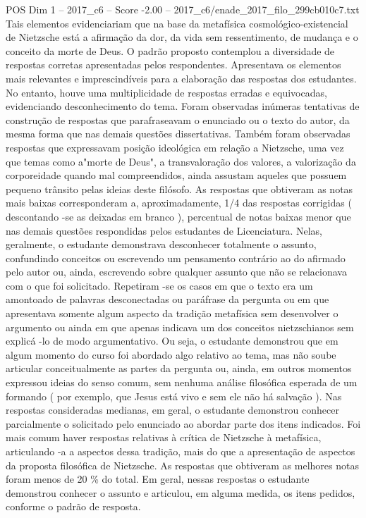 \begin{textsample}{POS Dim 1 – 2017\_c6 – Score -2.00 – 2017\_c6/enade\_2017\_filo\_299cb010c7.txt}
Tais elementos evidenciariam que na base da metafísica cosmológico-existencial de Nietzsche está a afirmação da dor, da vida sem ressentimento, de mudança e o conceito da morte de Deus.
O padrão proposto contemplou a diversidade de respostas corretas apresentadas pelos respondentes.
Apresentava os elementos mais relevantes e imprescindíveis para a elaboração das respostas dos estudantes.
No entanto, houve uma multiplicidade de respostas erradas e equivocadas, evidenciando desconhecimento do tema.
Foram observadas inúmeras tentativas de construção de respostas que parafraseavam o enunciado ou o texto do autor, da mesma forma que nas demais questões dissertativas.
Também foram observadas respostas que expressavam posição ideológica em relação a Nietzsche, uma vez que temas como a"morte de Deus", a transvaloração dos valores, a valorização da corporeidade quando mal compreendidos, ainda assustam aqueles que possuem pequeno trânsito pelas ideias deste filósofo.
As respostas que obtiveram as notas mais baixas corresponderam a, aproximadamente, 1/4 das respostas corrigidas ( descontando -se as deixadas em branco ), percentual de notas baixas menor que nas demais questões respondidas pelos estudantes de Licenciatura.
Nelas, geralmente, o estudante demonstrava desconhecer totalmente o assunto, confundindo conceitos ou escrevendo um pensamento contrário ao do afirmado pelo autor ou, ainda, escrevendo sobre qualquer assunto que não se relacionava com o que foi solicitado.
Repetiram -se os casos em que o texto era um amontoado de palavras desconectadas ou paráfrase da pergunta ou em que apresentava somente algum aspecto da tradição metafísica sem desenvolver o argumento ou ainda em que apenas indicava um dos conceitos nietzschianos sem explicá -lo de modo argumentativo.
Ou seja, o estudante demonstrou que em algum momento do curso foi abordado algo relativo ao tema, mas não soube articular conceitualmente as partes da pergunta ou, ainda, em outros momentos expressou ideias do senso comum, sem nenhuma análise filosófica esperada de um formando ( por exemplo, que Jesus está vivo e sem ele não há salvação ).
Nas respostas consideradas medianas, em geral, o estudante demonstrou conhecer parcialmente o solicitado pelo enunciado ao abordar parte dos itens indicados.
Foi mais comum haver respostas relativas à crítica de Nietzsche à metafísica, articulando -a a aspectos dessa tradição, mais do que a apresentação de aspectos da proposta filosófica de Nietzsche.
As respostas que obtiveram as melhores notas foram menos de 20 \% do total.
Em geral, nessas respostas o estudante demonstrou conhecer o assunto e articulou, em alguma medida, os itens pedidos, conforme o padrão de resposta.

\end{textsample}
